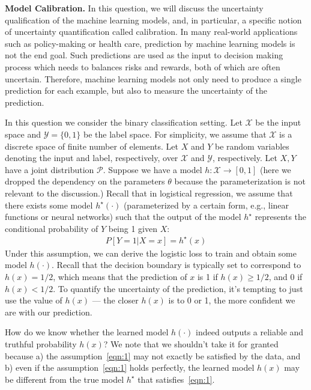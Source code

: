 \item {} {\bf Model Calibration.}
\renewcommand{\Pr}{P}
In this question, we will discuss the uncertainty qualification of the machine learning models, and, in particular, a specific notion of uncertainty quantification called calibration. 
In many  real-world applications such as policy-making or health care, prediction by machine learning models is not the end goal. Such predictions are used as  the input to decision making process which needs to balances risks and rewards, both of which are often uncertain. Therefore, machine learning models not only need to produce a single prediction for each example, but also to measure the uncertainty of the prediction. 

In this question we consider the binary classification setting. Let $\mathcal{X}$ be the input space and $\mathcal{Y}=\{0,1\}$ be the label space. For simplicity, we assume that $\mathcal{X}$ is a discrete space of finite number of elements. Let $X$ and $Y$ be random variables denoting the input and label, respectively, over $\mathcal{X}$ and $\mathcal{Y}$, respectively. Let $X,Y$ have a joint distribution $\mathcal{P}$. 
Suppose we have a model $h:\mathcal{X} \rightarrow [0,1]$ (here we dropped the dependency on the parameters $\theta$ because the parameterization is not relevant to the discussion.) Recall that in logistical regression, we assume that there exists some model $h^\star(\cdot)$ (parameterized by a certain form, e.g., linear functions or neural networks) such that the output of the model $h^\star$ represents the conditional probability of $Y$ being 1 given $X$:
\begin{align}
P\left[Y = 1 \vert X = x\right] = h^\star(x) \label{eqn:1}
\end{align}
Under this assumption, we can derive the logistic loss to train and obtain some model $h(\cdot)$. Recall that the decision boundary is typically set to correspond to $h(x) = 1/2$, which means that the prediction of $x$ is 1 if $h(x) \ge 1/2$, and 0 if $h(x) < 1/2$. To quantify the uncertainty of the prediction, it's tempting to just use the value of $h(x)$ --- the closer $h(x)$ is to 0 or 1, the more confident we are with our prediction. 

How do we know whether the learned model $h(\cdot)$ indeed outputs a reliable and truthful probability $h(x)$? We note that we shouldn't take it for granted because a) the assumption~\eqref{eqn:1} may not exactly be satisfied by the data, and b) even if the assumption~\eqref{eqn:1} holds perfectly, the learned model $h(x)$ may be different from the true model $h^\star$ that satisfies~\eqref{eqn:1}. 

